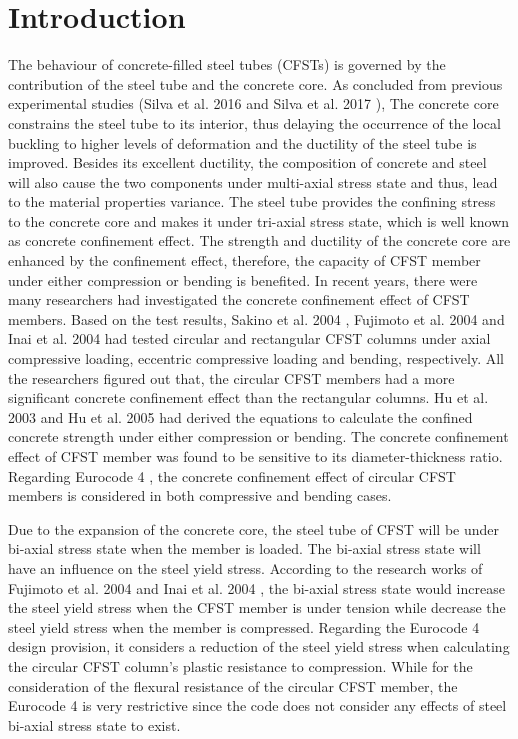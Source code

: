 \documentclass[12pt,a4]{article}
\begin{document}
	\section{Introduction}
	The behaviour of concrete-filled steel tubes (CFSTs) is governed by the contribution of the steel tube and the concrete core. As concluded from previous experimental studies (Silva et al. 2016 \cite{Silva2016} and Silva et al. 2017 \cite{RN140}), The concrete core constrains the steel tube to its interior, thus delaying the occurrence of the local buckling to higher levels of deformation and the ductility of the steel tube is improved. Besides its excellent ductility, the composition of concrete and steel will also cause the two components under multi-axial stress state and thus, lead to the material properties variance. The steel tube provides the confining stress to the concrete core and makes it under tri-axial stress state, which is well known as concrete confinement effect. The strength and ductility of the concrete core are enhanced by the confinement effect, therefore, the capacity of CFST member under either compression or bending is benefited. In recent years, there were many researchers had investigated the concrete confinement effect of CFST members. Based on the test results, Sakino et al. 2004 \cite{RN41}, Fujimoto et al. 2004 \cite{RN15} and Inai et al. 2004 \cite{RN30} had tested circular and rectangular CFST columns under axial compressive loading, eccentric compressive loading and bending, respectively. All the researchers figured out that, the circular CFST members had a more significant concrete confinement effect than the rectangular columns. Hu et al. 2003 \cite{RN1} and Hu et al. 2005 \cite{RN29} had derived the equations to calculate the confined concrete strength under either compression or bending. The concrete confinement effect of CFST member was found to be sensitive to its diameter-thickness ratio. Regarding Eurocode 4 \cite{RN64}, the concrete confinement effect of circular CFST members is considered in both compressive and bending cases.
	\par
	Due to the expansion of the concrete core, the steel tube of CFST will be under bi-axial stress state when the member is loaded. The bi-axial stress state will have an influence on the steel yield stress. According to the research works of Fujimoto et al. 2004 \cite{RN15} and Inai et al. 2004 \cite{RN30}, the bi-axial stress state would increase the steel yield stress when the CFST member is under tension while decrease the steel yield stress when the member is compressed. Regarding the Eurocode 4 \cite{RN64} design provision, it considers a reduction of the steel yield stress when calculating the circular CFST column's plastic resistance to compression. While for the consideration of the flexural resistance of the circular CFST member, the Eurocode 4 is very restrictive since the code does not consider any effects of steel bi-axial stress state to exist.
\end{document}
